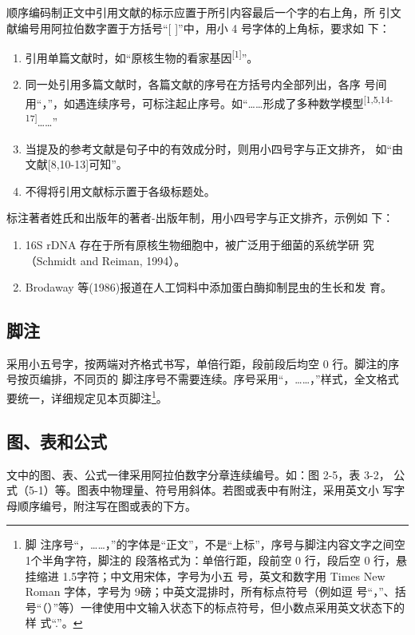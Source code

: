 顺序编码制正文中引用文献的标示应置于所引内容最后一个字的右上角，所
引文献编号用阿拉伯数字置于方括号“[ ]”中，用小 4 号字体的上角标，要求如
下：
\begin{enumerate}
\item 引用单篇文献时，如“原核生物的看家基因\textsuperscript{[1]}”。
\item 同一处引用多篇文献时，各篇文献的序号在方括号内全部列出，各序
号间用“，”，如遇连续序号，可标注起止序号。如“……形成了多种数学模型\textsuperscript{[1,5,14-17]}……”
       
\item 当提及的参考文献是句子中的有效成分时，则用小四号字与正文排齐，
如“由文献[8,10-13]可知”。
      
\item 不得将引用文献标示置于各级标题处。
\end{enumerate}
标注著者姓氏和出版年的著者-出版年制，用小四号字与正文排齐，示例如
下：
\begin{enumerate}
\item 16S rDNA 存在于所有原核生物细胞中，被广泛用于细菌的系统学研
究（Schmidt and Reiman, 1994）。
\item Brodaway 等(1986)报道在人工饲料中添加蛋白酶抑制昆虫的生长和发
  育。
\end{enumerate}

\subsection{脚注}
\label{sec:footnote}

采用小五号字，按两端对齐格式书写，单倍行距，段前段后均空 0 行。脚注的序号按页编排，不同页的
脚注序号不需要连续。序号采用“，……，”样式，全文格式要统一，详细规定见本页脚注\footnote{脚
  注序号“，……，”的字体是“正文”，不是“上标”，序号与脚注内容文字之间空 1个半角字符，脚注的
  段落格式为：单倍行距，段前空 0 行，段后空 0 行，悬挂缩进 1.5字符；中文用宋体，字号为小五
  号，英文和数字用 Times New Roman 字体，字号为 9磅；中英文混排时，所有标点符号（例如逗
  号“，”、括号“（）”等）一律使用中文输入状态下的标点符号，但小数点采用英文状态下的样
  式“.”。}。

\subsection{图、表和公式}
\label{sec:floats}

文中的图、表、公式一律采用阿拉伯数字分章连续编号。如：图 2-5，表 3-2，
公式（5-1）等。图表中物理量、符号用斜体。若图或表中有附注，采用英文小
写字母顺序编号，附注写在图或表的下方。

